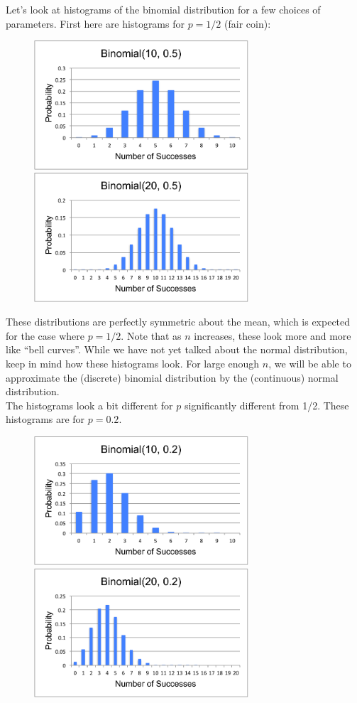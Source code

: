 \documentclass[12pt]{article}
\theoremstyle{definition}
\theoremstyle{remark}
\begin{document}
Let's look at histograms of the binomial distribution for a few choices of parameters. First here are histograms for $p=1/2$ (fair coin):
\begin{figure}[H]
\centering
\includegraphics[width=8cm]{binomial105}
\includegraphics[width=8cm]{binomial205}
\end{figure}
These distributions are perfectly symmetric about the mean, which is expected for the case where $p = 1/2$. Note that as $n$ increases, these look more and more like ``bell curves''. While we have not yet talked about the normal distribution, keep in mind how these histograms look. For large enough $n$, we will be able to approximate the (discrete) binomial distribution by the (continuous) normal distribution.\\

The histograms look a bit different for $p$ significantly different from 1/2. These histograms are for $p = 0.2$.
\begin{figure}[H]
\centering
\includegraphics[width=8cm]{binomial102}
\includegraphics[width=8cm]{binomial202}
\end{figure}
\end{document}
